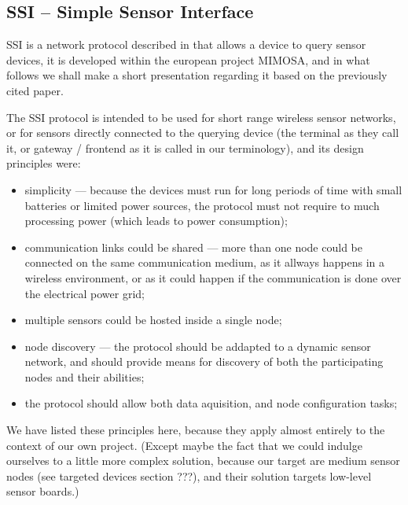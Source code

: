
	\subsection{SSI -- Simple Sensor Interface}

SSI is a network protocol described in \cite{Hyyrylaeinen2005} that allows a device to query sensor devices, it is developed within the european project MIMOSA, and in what follows we shall make a short presentation regarding it based on the previously cited paper.

The SSI protocol is intended to be used for short range wireless sensor networks, or for sensors directly connected to the querying device (the terminal as they call it, or gateway / frontend as it is called in our terminology), and its design principles were:
\begin{itemize}
	\item simplicity --- because the devices must run for long periods of time with small batteries or limited power sources, the protocol must not require to much processing power (which leads to power consumption);
	\item communication links could be shared --- more than one node could be connected on the same communication medium, as it allways happens in a wireless environment, or as it could happen if the communication is done over the electrical power grid;
	\item multiple sensors could be hosted inside a single node;
	\item node discovery --- the protocol should be addapted to a dynamic sensor network, and should provide means for discovery of both the participating nodes and their abilities;
	\item the protocol should allow both data aquisition, and node configuration tasks;
\end{itemize}

We have listed these principles here, because they apply almost entirely to the context of our own project. (Except maybe the fact that we could indulge ourselves to a little more complex solution, because our target are medium sensor nodes (see targeted devices section ???), and their solution targets low-level sensor boards.)


